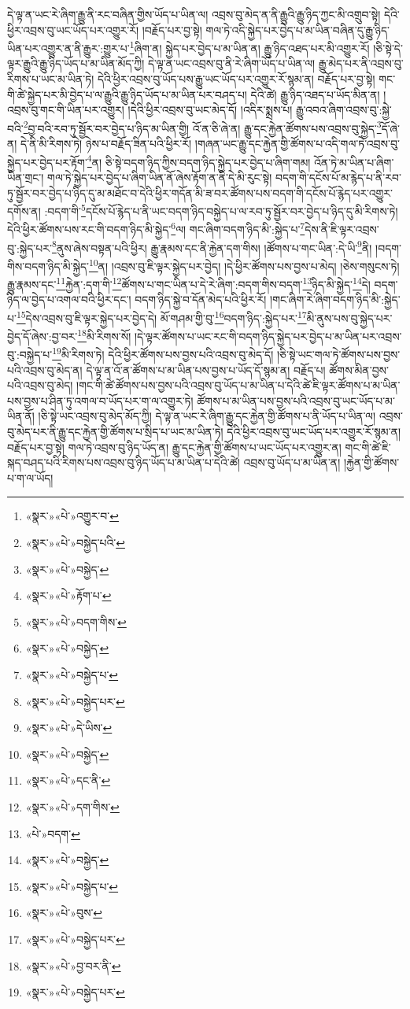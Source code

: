 དེ་ལྟ་ན་ཡང་རེ་ཞིག་རྒྱུ་ནི་རང་བཞིན་གྱིས་ཡོད་པ་ཡིན་ལ། འབྲས་བུ་མེད་ན་ནི་རྒྱུའི་རྒྱུ་ཉིད་ཀྱང་མི་འགྲུབ་སྟེ། དེའི་ཕྱིར་འབྲས་བུ་ཡང་ཡོད་པར་འགྱུར་རོ། །བརྗོད་པར་བྱ་སྟེ། གལ་ཏེ་འདི་སྐྱེད་པར་བྱེད་པ་མ་ཡིན་བཞིན་དུ་རྒྱུ་ཉིད་ཡིན་པར་འགྱུར་ན་ནི་རྒྱུར་:གྱུར་པ་\footnote{«སྣར་»«པེ་»འགྱུར་བ་}ཞིག་ན། སྐྱེད་པར་བྱེད་པ་མ་ཡིན་ན། རྒྱུ་ཉིད་འཐད་པར་མི་འགྱུར་རོ། །ཅི་སྟེ་དེ་ལྟར་རྒྱུའི་རྒྱུ་ཉིད་ཡོད་པ་མ་ཡིན་མོད་ཀྱི། དེ་ལྟ་ན་ཡང་འབྲས་བུ་ནི་རེ་ཞིག་ཡོད་པ་ཡིན་ལ། རྒྱུ་མེད་པར་ནི་འབྲས་བུ་རིགས་པ་ཡང་མ་ཡིན་ཏེ། དེའི་ཕྱིར་འབྲས་བུ་ཡོད་པས་རྒྱུ་ཡང་ཡོད་པར་འགྱུར་རོ་སྙམ་ན། བརྗོད་པར་བྱ་སྟེ། གང་གི་ཚེ་སྐྱེད་པར་མི་བྱེད་པ་ལ་རྒྱུའི་རྒྱུ་ཉིད་ཡོད་པ་མ་ཡིན་པར་བཤད་པ། དེའི་ཚེ། རྒྱུ་ཉིད་འཐད་པ་ཡོད་མིན་ན། །འབྲས་བུ་གང་གི་ཡིན་པར་འགྱུར། །དེའི་ཕྱིར་འབྲས་བུ་ཡང་མེད་དོ། །འདིར་སྨྲས་པ། རྒྱུ་འབའ་ཞིག་འབྲས་བུ་:སྐྱེ་བའི་\footnote{«སྣར་»«པེ་»བསྐྱེད་པའི་}བྱ་བའི་རབ་ཏུ་སྦྱོར་བར་བྱེད་པ་ཉིད་མ་ཡིན་གྱི། འོ་ན་ཅི་ཞེ་ན། རྒྱུ་དང་རྐྱེན་ཚོགས་པས་འབྲས་བུ་སྐྱེད་\footnote{«སྣར་»«པེ་»བསྐྱེད་}དོ་ཞེ་ན། དེ་ནི་མི་རིགས་ཏེ། ཉེས་པ་བརྗོད་ཟིན་པའི་ཕྱིར་རོ། །གཞན་ཡང་རྒྱུ་དང་རྐྱེན་གྱི་ཚོགས་པ་འདི་གལ་ཏེ་འབྲས་བུ་སྐྱེད་པར་བྱེད་པར་རྟོག་\footnote{«སྣར་»«པེ་»རྟོག་པ་}ན། ཅི་སྟེ་བདག་ཉིད་ཀྱིས་བདག་ཉིད་སྐྱེད་པར་བྱེད་པ་ཞིག་གམ། འོན་ཏེ་མ་ཡིན་པ་ཞིག་ཡིན་གྲང་། གལ་ཏེ་སྐྱེད་པར་བྱེད་པ་ཞིག་ཡིན་ནོ་ཞེས་རྟོག་ན་ནི་དེ་མི་རུང་སྟེ། བདག་གི་དངོས་པོ་མ་རྙེད་པ་ནི་རབ་ཏུ་སྦྱོར་བར་བྱེད་པ་ཉིད་དུ་མ་མཐོང་བ་དེའི་ཕྱིར་གདོན་མི་ཟ་བར་ཚོགས་པས་བདག་གི་དངོས་པོ་རྙེད་པར་འགྱུར་དགོས་ན། :བདག་གི་\footnote{«སྣར་»«པེ་»བདག་གིས་}དངོས་པོ་རྙེད་པ་ནི་ཡང་བདག་ཉིད་བསྐྱེད་པ་ལ་རབ་ཏུ་སྦྱོར་བར་བྱེད་པ་ཉིད་དུ་མི་རིགས་ཏེ། དེའི་ཕྱིར་ཚོགས་པས་རང་གི་བདག་ཉིད་མི་སྐྱེད་\footnote{«སྣར་»«པེ་»བསྐྱེད་}ལ། གང་ཞིག་བདག་ཉིད་མི་:སྐྱེད་པ་\footnote{«སྣར་»«པེ་»བསྐྱེད་པ་}དེས་ནི་ཇི་ལྟར་འབྲས་བུ་:སྐྱེད་པར་\footnote{«སྣར་»«པེ་»བསྐྱེད་པར་}ནུས་ཞེས་བསྟན་པའི་ཕྱིར། རྒྱུ་རྣམས་དང་ནི་རྐྱེན་དག་གིས། །ཚོགས་པ་གང་ཡིན་:དེ་ཡི་\footnote{«སྣར་»«པེ་»དེ་ཡིས་}ནི། །བདག་གིས་བདག་ཉིད་མི་སྐྱེད་\footnote{«སྣར་»«པེ་»བསྐྱེད་}ན། །འབྲས་བུ་ཇི་ལྟར་སྐྱེད་པར་བྱེད། །དེ་ཕྱིར་ཚོགས་པས་བྱས་པ་མེད། །ཅེས་གསུངས་ཏེ། རྒྱུ་རྣམས་དང་\footnote{«སྣར་»«པེ་»དང་ནི་}རྐྱེན་:དག་གི་\footnote{«སྣར་»«པེ་»དག་གིས་}ཚོགས་པ་གང་ཡིན་པ་དེ་རེ་ཞིག་:བདག་གིས་བདག་\footnote{«པེ་»བདག་}ཉིད་མི་སྐྱེད་\footnote{«སྣར་»«པེ་»བསྐྱེད་}དེ། བདག་ཉིད་ལ་བྱེད་པ་འགལ་བའི་ཕྱིར་དང་། བདག་ཉིད་སྐྱེ་བ་དོན་མེད་པའི་ཕྱིར་རོ། །གང་ཞིག་རེ་ཞིག་བདག་ཉིད་མི་:སྐྱེད་པ་\footnote{«སྣར་»«པེ་»བསྐྱེད་པ་}དེས་འབྲས་བུ་ཇི་ལྟར་སྐྱེད་པར་བྱེད་དེ། མོ་གཤམ་གྱི་བུ་\footnote{«སྣར་»«པེ་»བུས་}བདག་ཉིད་:སྐྱེད་པར་\footnote{«སྣར་»«པེ་»བསྐྱེད་པར་}མི་ནུས་པས་བུ་སྐྱེད་པར་བྱེད་དོ་ཞེས་:བྱ་བར་\footnote{«སྣར་»«པེ་»བྱ་བར་ནི་}མི་རིགས་སོ། །དེ་ལྟར་ཚོགས་པ་ཡང་རང་གི་བདག་ཉིད་སྐྱེད་པར་བྱེད་པ་མ་ཡིན་པར་འབྲས་བུ་:བསྐྱེད་པ་\footnote{«སྣར་»«པེ་»བསྐྱེད་པར་}མི་རིགས་ཏེ། དེའི་ཕྱིར་ཚོགས་པས་བྱས་པའི་འབྲས་བུ་མེད་དོ། །ཅི་སྟེ་ཡང་གལ་ཏེ་ཚོགས་པས་བྱས་པའི་འབྲས་བུ་མེད་ན། དེ་ལྟ་ན་འོ་ན་ཚོགས་པ་མ་ཡིན་པས་བྱས་པ་ཡོད་དོ་སྙམ་ན། བརྗོད་པ། ཚོགས་མིན་བྱས་པའི་འབྲས་བུ་མེད། །གང་གི་ཚེ་ཚོགས་པས་བྱས་པའི་འབྲས་བུ་ཡོད་པ་མ་ཡིན་པ་དེའི་ཚེ་ཇི་ལྟར་ཚོགས་པ་མ་ཡིན་པས་བྱས་པ་ཤིན་ཏུ་འགལ་བ་ཡོད་པར་ག་ལ་འགྱུར་ཏེ། ཚོགས་པ་མ་ཡིན་པས་བྱས་པའི་འབྲས་བུ་ཡང་ཡོད་པ་མ་ཡིན་ནོ། །ཅི་སྟེ་ཡང་འབྲས་བུ་མེད་མོད་ཀྱི། དེ་ལྟ་ན་ཡང་རེ་ཞིག་རྒྱུ་དང་རྐྱེན་གྱི་ཚོགས་པ་ནི་ཡོད་པ་ཡིན་ལ། འབྲས་བུ་མེད་པར་ནི་རྒྱུ་དང་རྐྱེན་གྱི་ཚོགས་པ་སྲིད་པ་ཡང་མ་ཡིན་ཏེ། དེའི་ཕྱིར་འབྲས་བུ་ཡང་ཡོད་པར་འགྱུར་རོ་སྙམ་ན། བརྗོད་པར་བྱ་སྟེ། གལ་ཏེ་འབྲས་བུ་ཉིད་ཡོད་ན། རྒྱུ་དང་རྐྱེན་གྱི་ཚོགས་པ་ཡང་ཡོད་པར་འགྱུར་ན། གང་གི་ཚེ་ཇི་སྐད་བཤད་པའི་རིགས་པས་འབྲས་བུ་ཉིད་ཡོད་པ་མ་ཡིན་པ་དེའི་ཚེ། འབྲས་བུ་ཡོད་པ་མ་ཡིན་ན། །རྐྱེན་གྱི་ཚོགས་པ་ག་ལ་ཡོད། 